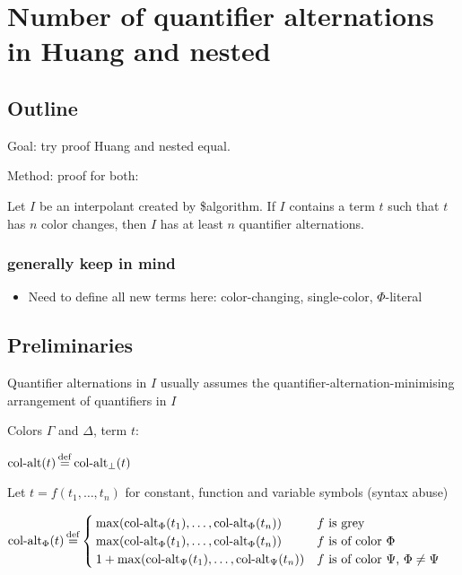 \documentclass[,%
	draft=false,%
	numbers=noendperiod
	12pt,
	a4paper,
	oneside,%
	openany,
]{memoir}
\begin{document}
\chapter{ Number of quantifier alternations in Huang and nested }

\section{ Outline }

Goal: try proof Huang and nested equal.

Method: proof for both:

\begin{cprop}
	Let $I$ be an interpolant created by \$algorithm.
	If $I$ contains a term $t$ such that $t$ has $n$ color changes, then $I$ has at least $n$ quantifier alternations.
\end{cprop}

\subsection{generally keep in mind}

\begin{itemize}
	\item Need to define all new terms here: color-changing, single-color, $\Phi$-literal
\end{itemize}

\section{ Preliminaries }

Quantifier alternations in $I$ usually assumes the quantifier-alternation-minimising arrangement of quantifiers in $I$ 

\begin{defi}
	Colors $\Gamma$ and $\Delta$, term $t$:

	$\ca(t) \defeq \ca_\bot(t)$

	Let $t = f(t_1, \dots, t_n)$ for constant, function and variable symbols (syntax abuse)

	
	$\ca_\Phi(t) \defeq 
	\begin{cases}
		\max(\ca_\Phi(t_1), \dots, \ca_\Phi(t_n)) & \text{$f$ is grey} \\
		\max(\ca_\Phi(t_1), \dots, \ca_\Phi(t_n)) & \text{$f$ is of color $\Phi$} \\
		1 + \max(\ca_\Psi(t_1), \dots, \ca_\Psi(t_n)) & \text{$f$ is of color $\Psi$, $\Phi \neq \Psi$} \\
	\end{cases}
	$
\end{defi}
\end{document}
